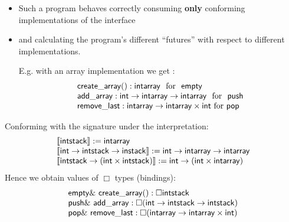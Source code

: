 \documentclass{beamer}
\begin{document}
 \begin{frame}
     \begin{itemize}
   \item Such a program behaves correctly consuming \textbf{only} conforming implementations of the interface 
    \item and calculating the program's different “futures” with respect to different implementations.
  
   E.g. with an array implementation we get :
   \[\begin{array}{l} { \sf create\_array(): intarray} \ \ \text{for}\ \ {\sf empty}\\ {\sf add\_array: int \rightarrow intarray\rightarrow intarray}\ \ \text{for} \ \ {\sf push}\\ {\sf remove\_last: intarray\rightarrow intarray\times int }\ \text{for}\ {\sf pop} \end{array} \]
   \end{itemize} 
  \end{frame}
  \begin{frame}
    Conforming with the signature under the interpretation:\\
    
    \[ \begin{array}{l} \llbracket {\sf intstack} \rrbracket:= {\sf intarray} \\ \llbracket {\sf int \rightarrow intstack\rightarrow instack } \rrbracket:= {\sf int \rightarrow intarray\rightarrow intarray} \\ \llbracket {\sf intstack \rightarrow (int \times intstack)} \rrbracket:= {\sf int\rightarrow (int\times intarray)}\\ \end{array} \]
    Hence we obtain values of $\Box$ types (bindings): \\
    
   \[ \begin{array}{l} { \sf empty \& \ create\_array():\Box intstack} \\ {\sf push \&\ add\_array :\Box (int \rightarrow intstack\rightarrow intstack)}\\ {\sf pop \&\ remove\_last: \Box (intarray\rightarrow intarray\times int)} \end{array} \]
   \end{frame}
\end{document}
